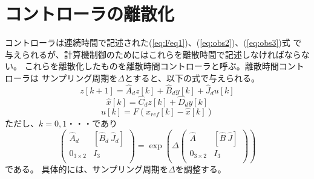 \section{コントローラの離散化}
	コントローラは連続時間で記述された(\ref{eq:Feq1})、(\ref{eq:obs2})、(\ref{eq:obs3})式
	で与えられるが、計算機制御のためにはこれらを離散時間で記述しなければならない。
	これらを離散化したものを離散時間コントローラと呼ぶ。離散時間コントローラは
	サンプリング周期を$\Delta$とすると、以下の式で与えられる。
	\begin{equation}
		z[k+1] = \hat{A}_{d}z[k]+\hat{B}_{d}y[k]+\hat{J}_{d}u[k]
	\end{equation}
	\begin{equation}
		\hat{x}[k] = \hat{C}_{d}z[k] + \hat{D}_{d}y[k]
	\end{equation}
	\begin{equation}
		u[k] = F(x_{ref}[k] - \hat{x}[k])
	\end{equation}
	ただし、$k = 0,1・・・$であり
	\[
		\left(
		\begin{array}{cc}
			\hat{A}_{d} & [\hat{B}_{d}\ \hat{J}_{d}]\\
			0_{3×2} & I_{3}\\
		\end{array}
		\right)=\exp\left(\Delta\left(
		\begin{array}{cc}
			\hat{A} & [\hat{B}\ \hat{J}]\\
			0_{3×2} & I_{3}\\
		\end{array}
		\right)\right)
	\]
	である。
	具体的には、サンプリング周期を$\Delta$を調整する。
